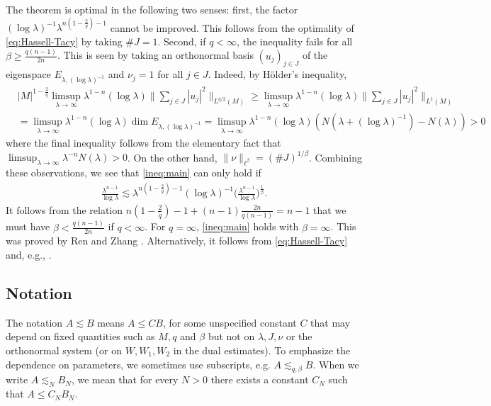 \documentclass[12pt,reqno,a4paper]{amsart}
\begin{document}
The theorem is optimal in the following two senses:
first, the factor $(\log\lambda)^{-1} \lambda^{n(1-\frac{2}{q})-1}$ cannot be improved. This follows from the optimality of~ \eqref{eq:Hassell-Tacy} by taking $\# J=1$.
Second, if $q<\infty$, the inequality fails for all $\beta\ge  \frac{q(n-1)}{2n}$. This is seen by taking an orthonormal basis $(u_j)_{j\in J}$ of the eigenspace $E_{\lambda,(\log\lambda)^{-1}}$ and $\nu_j=1$ for all $j\in J$. Indeed, by H\"older's inequality,
\begin{align*}
&|M|^{1-\frac{2}{q}}\limsup_{\lambda \to \infty}  \lambda^{1-n} (\log \lambda)   \bigg\|\sum_{j\in J} |u_j|^2\bigg\|_{L^{q/2}(M)}
\geq 
\limsup_{\lambda \to \infty}  \lambda^{1-n} (\log \lambda)   \bigg\lVert\sum_{j\in J} |u_j|^2\bigg\rVert_{L^{1}(M)}
\\
&=\limsup_{\lambda \to \infty} \lambda^{1-n} (\log \lambda)\dim E_{\lambda,(\log\lambda)^{-1}}
=\limsup_{\lambda \to \infty} \lambda^{1-n} (\log \lambda)(N(\lambda+(\log\lambda)^{-1})-N(\lambda))>0
\end{align*}
where the final inequality follows from the elementary fact that $\limsup_{\lambda \to \infty}  \lambda^{-n}N(\lambda)>0$.
On the other hand, $\|\nu\|_{\ell^{\beta}}=(\# J)^{1/\beta}$.
Combining these observations, we see that \eqref{ineq:main} can only hold if
\begin{align}
  \frac{\lambda^{n-1}}{\log\lambda}\lesssim\lambda^{n(1-\frac{2}{q})-1}(\log\lambda)^{-1 }\Big(\frac{\lambda^{n-1}}{\log\lambda}\Big)^{\frac{1}{\beta}}.
\end{align}
It follows from the relation $n(1-\frac{2}{q})-1 + (n-1)\frac{2n}{q(n-1)} = n-1$ that we must have $\beta < \frac{q(n-1)}{2n}$ if \(q<\infty\). For \(q=\infty\), \eqref{ineq:main} holds with $\beta=\infty$. This was proved by  Ren and Zhang \cite{RenZhang-2024}. Alternatively, it follows from \eqref{eq:Hassell-Tacy} and, e.g., \cite[Proposition 2.1]{CueninNguyenSu2025}.

\subsection*{Notation} The notation $A\lesssim B$ means $A\leq CB$, for some unspecified
constant $C$ that may depend on fixed quantities such as $M,q$ and $\beta$ but not on $\lambda,J,\nu$ or the orthonormal system (or on $W,W_1,W_2$ in the dual estimates). To emphasize the dependence on parameters, we sometimes use subscripts, e.g. $A\lesssim_{q,\beta} B$. When we write $A\lesssim_N B_N$, we mean that for every $N>0$ there exists a constant $C_N$ such that $A\leq C_N B_N$.
\end{document}
